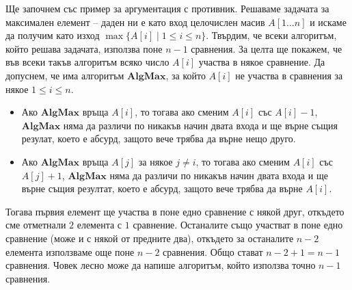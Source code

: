\documentclass{article}
\theoremstyle{definition}
\theoremstyle{plain}
\theoremstyle{remark}
\theoremstyle{definition}
\begin{document}
Ще започнем със пример за аргументация с противник.
Решаваме задачата за максимален елемент -- даден ни е като вход целочислен масив $A[1 \dots n]$ и искаме да получим като изход $\max \{ A[i] \mid 1 \leq i \leq n \}$.
Твърдим, че всеки алгоритъм, който решава задачата, използва поне $n - 1$ сравнения.
За целта ще покажем, че във всеки такъв алгоритъм всяко число $A[i]$ участва в някое сравнение.
Да допуснем, че има алгоритъм $\mathbf{AlgMax}$, за който $A[i]$ не участва в сравнения за някое $1 \leq i \leq n$.
\begin{itemize}
    \item Ако $\mathbf{AlgMax}$ връща $A[i]$, то тогава ако сменим $A[i]$ със $A[i] - 1$, $\mathbf{AlgMax}$ няма да различи по никакъв начин двата входа и ще върне същия резулат, което е абсурд, защото вече трябва да върне нещо друго.
    \item Ако $\mathbf{AlgMax}$ връща $A[j]$ за някое $j \neq i$, то тогава ако сменим $A[i]$ със $A[j] + 1$, $\mathbf{AlgMax}$ няма да различи по никакъв начин двата входа и ще върне същия резултат, което е абсурд, защото вече трябва да върне $A[i]$.
\end{itemize}
Тогава първия елемент ще участва в поне едно сравнение с някой друг, откъдето сме отметнали $2$ елемента с $1$ сравнение.
Останалите също участват в поне едно сравнение (може и с някой от предните два), откъдето за останалите $n - 2$ елемента използваме още поне $n - 2$ сравнения.
Общо стават $n - 2 + 1 = n - 1$ сравнения.
Човек лесно може да напише алгоритъм, който използва точно $n - 1$ сравнения.
\end{document}
